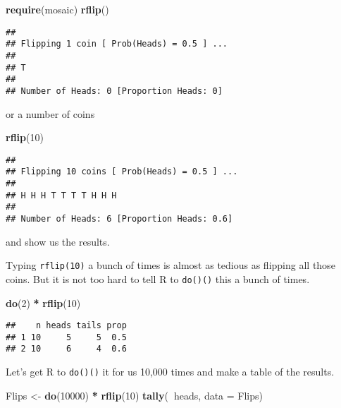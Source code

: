 \documentclass[]{book}
\newenvironment{Shaded}{\begin{snugshade}}{\end{snugshade}}
\newcommand{\DataTypeTok}[1]{\textcolor[rgb]{0.13,0.29,0.53}{#1}}
\newcommand{\DecValTok}[1]{\textcolor[rgb]{0.00,0.00,0.81}{#1}}
\newcommand{\KeywordTok}[1]{\textcolor[rgb]{0.13,0.29,0.53}{\textbf{#1}}}
\newcommand{\NormalTok}[1]{#1}
\newcommand{\OperatorTok}[1]{\textcolor[rgb]{0.81,0.36,0.00}{\textbf{#1}}}
\newcommand{\StringTok}[1]{\textcolor[rgb]{0.31,0.60,0.02}{#1}}
\begin{document}
\begin{Shaded}
\begin{Highlighting}[]
\KeywordTok{require}\NormalTok{(mosaic)}
\KeywordTok{rflip}\NormalTok{()}
\end{Highlighting}
\end{Shaded}

\begin{verbatim}
## 
## Flipping 1 coin [ Prob(Heads) = 0.5 ] ...
## 
## T
## 
## Number of Heads: 0 [Proportion Heads: 0]
\end{verbatim}

or a number of coins

\begin{Shaded}
\begin{Highlighting}[]
\KeywordTok{rflip}\NormalTok{(}\DecValTok{10}\NormalTok{)}
\end{Highlighting}
\end{Shaded}

\begin{verbatim}
## 
## Flipping 10 coins [ Prob(Heads) = 0.5 ] ...
## 
## H H H T T T T H H H
## 
## Number of Heads: 6 [Proportion Heads: 0.6]
\end{verbatim}

and show us the results.

Typing \texttt{rflip(10)} a bunch of times is almost as tedious as flipping all those coins. But it is not too hard to tell R to \texttt{do()()} this a bunch of times.

\begin{Shaded}
\begin{Highlighting}[]
\KeywordTok{do}\NormalTok{(}\DecValTok{2}\NormalTok{) }\OperatorTok{*}\StringTok{ }\KeywordTok{rflip}\NormalTok{(}\DecValTok{10}\NormalTok{)}
\end{Highlighting}
\end{Shaded}

\begin{verbatim}
##    n heads tails prop
## 1 10     5     5  0.5
## 2 10     6     4  0.6
\end{verbatim}

Let's get R to \texttt{do()()} it for us 10,000 times and make a table of the results.

\begin{Shaded}
\begin{Highlighting}[]
\NormalTok{Flips <-}\StringTok{ }\KeywordTok{do}\NormalTok{(}\DecValTok{10000}\NormalTok{) }\OperatorTok{*}\StringTok{ }\KeywordTok{rflip}\NormalTok{(}\DecValTok{10}\NormalTok{)}
\KeywordTok{tally}\NormalTok{(}\OperatorTok{~}\NormalTok{heads, }\DataTypeTok{data =}\NormalTok{ Flips)}
\end{Highlighting}
\end{Shaded}
\end{document}
